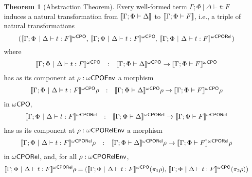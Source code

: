 \documentclass[acmsmall,review,anonymous]{acmart}
\theoremstyle{definition}
\newtheorem*{nono-theorem}{Theorem}
\begin{document}
\begin{nono-theorem}[Abstraction Theorem]\label{thm:at-gen}
Every well-formed term $\Gamma;\Phi~|~\Delta \vdash t : F$ induces
a natural transformation from $\llbracket{\Gamma; \Phi \vdash \Delta}\rrbracket$ to
$\llbracket{\Gamma; \Phi \vdash F}\rrbracket$, i.e., a triple of natural
transformations 
\[(\llbracket{\Gamma;\Phi~|~\Delta \vdash t : F}\rrbracket^{{\omega\mathsf{CPO}}},\,
\llbracket{\Gamma;\Phi~|~\Delta \vdash t : F}\rrbracket^{{\omega\mathsf{CPO}}},\,
\llbracket{\Gamma;\Phi~|~\Delta \vdash t : F}\rrbracket^{{\omega\mathsf{CPORel}}})\]
where
\[\begin{array}{lll}
\llbracket{\Gamma;\Phi~|~\Delta \vdash t : F}\rrbracket^{{\omega\mathsf{CPO}}} & : & \llbracket{\Gamma;
  \Phi \vdash \Delta}\rrbracket^{{\omega\mathsf{CPO}}} \to \llbracket{\Gamma; \Phi \vdash F}\rrbracket^{{\omega\mathsf{CPO}}}
\end{array}\]
has as its component at $\rho : \omega\mathsf{CPOEnv}$ a morphism
\[\begin{array}{lll}
\llbracket{\Gamma;\Phi~|~\Delta \vdash t : F}\rrbracket^{{\omega\mathsf{CPO}}}\rho & : & \llbracket{\Gamma;
  \Phi \vdash \Delta}\rrbracket^{{\omega\mathsf{CPO}}}\rho \to \llbracket{\Gamma; \Phi \vdash F}\rrbracket^{{\omega\mathsf{CPO}}}\rho
\end{array}\]
in ${\omega\mathsf{CPO}}$,
\[\begin{array}{lll}
\llbracket{\Gamma;\Phi~|~\Delta \vdash t : F}\rrbracket^{{\omega\mathsf{CPORel}}} & : & \llbracket{\Gamma;
  \Phi \vdash \Delta}\rrbracket^{{\omega\mathsf{CPORel}}} \to \llbracket{\Gamma; \Phi \vdash F}\rrbracket^{{\omega\mathsf{CPORel}}}
\end{array}\]
has as its component at $\rho : \omega\mathsf{CPORelEnv}$ a morphism
\[\begin{array}{lll}
\llbracket{\Gamma;\Phi~|~\Delta \vdash t : F}\rrbracket^{{\omega\mathsf{CPORel}}}\rho & : & \llbracket{\Gamma;
  \Phi \vdash \Delta}\rrbracket^{{\omega\mathsf{CPORel}}}\rho \to \llbracket{\Gamma; \Phi \vdash F}\rrbracket^{{\omega\mathsf{CPORel}}}\rho
\end{array}\]
in ${\omega\mathsf{CPORel}}$,
and, for all $\rho : \omega\mathsf{CPORelEnv}$,
\begin{equation}\label{eq:projs}
\llbracket{\Gamma;\Phi~|~\Delta \vdash t : F}\rrbracket^{{\omega\mathsf{CPORel}}}\rho =
(\llbracket{\Gamma;\Phi~|~\Delta \vdash t : F}\rrbracket^{{\omega\mathsf{CPO}}}(\pi_1 \rho),\,
\llbracket{\Gamma;\Phi~|~\Delta \vdash t : F}\rrbracket^{{\omega\mathsf{CPO}}}(\pi_2 \rho))
\end{equation}
\end{nono-theorem}
\end{document}
